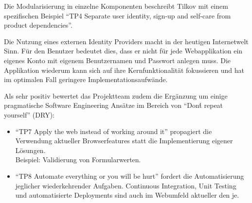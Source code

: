 Die Modularisierung in einzelne Komponenten beschreibt Tilkov mit einem spezifischen Beispiel ``TP4 Separate user identity, sign-up and self-care from product dependencies''.

Die Nutzung eines externen Identity Providers macht in der heutigen Internetwelt Sinn. Für den Benutzer bedeutet dies, dass er nicht für jede Webapplikation ein eigenes Konto mit eigenem Benutzernamen und Passwort anlegen muss. Die Applikation wiederum kann sich auf ihre Kernfunktionalität fokussieren und hat im optimalen Fall geringere Implementationsaufwände.

Als sehr positiv bewertet das Projektteam zudem die Ergänzung um einige pragmatische Software Engineering Ansätze im Bereich von ``Don\'t repeat yourself'' (DRY):

\begin{itemize}
	\item ``TP7 Apply the web instead of working around it'' propagiert die Verwendung aktueller Browserfeatures statt die Implementierung eigener Lösungen.\\
	Beispiel: Validierung von Formularwerten.
	\item ``TP8 Automate everything or you will be hurt'' fordert die Automatisierung jeglicher wiederkehrender Aufgaben. Continuous Integration, Unit Testing und automatisierte Deployments sind auch im Webumfeld aktueller den je.
\end{itemize}
